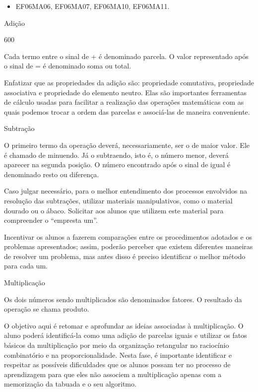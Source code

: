\begin{itemize} 
\item  EF06MA06, EF06MA07, EF06MA10, EF06MA11.
\end{itemize}

Adição

600

Cada termo entre o sinal de + é denominado parcela. O valor representado
após o sinal de = é denominado soma ou total.

Enfatizar que as propriedades da adição são: propriedade comutativa,
propriedade associativa e propriedade do elemento neutro. Elas são
importantes ferramentas de cálculo usadas para facilitar a realização
das operações matemáticas com as quais podemos trocar a ordem das
parcelas e associá-las de maneira conveniente.

Subtração


O primeiro termo da operação deverá, necessariamente, ser o de maior
valor. Ele é chamado de minuendo. Já o subtraendo, isto é, o número
menor, deverá aparecer na segunda posição. O número encontrado após o
sinal de igual é denominado resto ou diferença.

Caso julgar necessário, para o melhor entendimento dos processos
envolvidos na resolução das subtrações, utilizar materiais
manipulativos, como o material dourado ou o ábaco. Solicitar aos alunos
que utilizem este material para compreender o ``empresta um''.

Incentivar os alunos a fazerem comparações entre os procedimentos
adotados e os problemas apresentados; assim, poderão perceber que
existem diferentes maneiras de resolver um problema, mas antes disso é
preciso identificar o melhor método para cada um.

Multiplicação


Os dois números sendo multiplicados são denominados fatores. O resultado
da operação se chama produto.

O objetivo aqui é retomar e aprofundar as ideias associadas à
multiplicação. O aluno poderá identificá-la como uma adição de parcelas
iguais e utilizar os fatos básicos da multiplicação por meio da
organização retangular no raciocínio combinatório e na
proporcionalidade. Nesta fase, é importante identificar e respeitar as
possíveis dificuldades que os alunos possam ter no processo de
aprendizagem para que eles não associem a multiplicação apenas com a
memorização da tabuada e o seu algoritmo.

